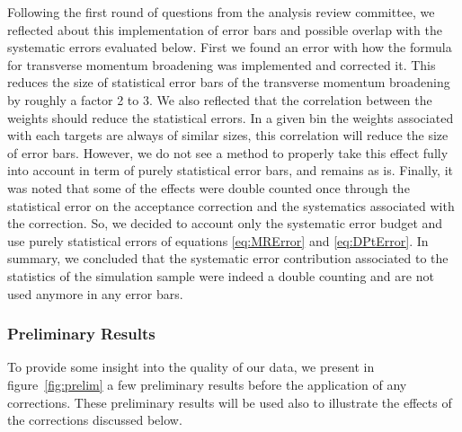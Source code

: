 Following the first round of questions from the analysis review committee, we
reflected about this implementation of error bars and possible overlap with the 
systematic errors evaluated below. First we found an error with how the formula
for transverse momentum broadening was implemented and corrected it. This 
reduces the size of statistical 
error bars of the transverse momentum broadening by roughly a factor 2 to 3. 
We also reflected that the correlation between the weights should reduce
the statistical errors. In a given bin the weights associated with each 
targets are always of similar sizes, this correlation will reduce the size of 
error bars. However, we do not see a method to properly take this 
effect fully into account in term of purely statistical error bars, and
remains as is. Finally, 
it was noted that some of the effects were double counted once through the 
statistical error on the acceptance correction and the systematics associated
with the correction. So, we decided to account only the systematic error budget
and use purely statistical errors of equations
\ref{eq:MRError} and \ref{eq:DPtError}. In summary, we concluded that the 
systematic error contribution associated to the statistics of the 
simulation sample were indeed a double counting and are not used anymore
in any error bars.

\subsubsection{Preliminary Results}
\label{prelim}

To provide some insight into the quality of our data, we present in 
figure~\ref{fig:prelim} a few preliminary results before the application of 
any corrections. These preliminary results will be used also to illustrate 
the effects of the corrections discussed below.

